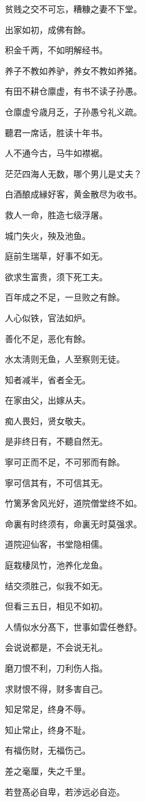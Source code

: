 \documentclass[12pt,oneside]{book}
\begin{document}
贫贱之交不可忘，糟糠之妻不下堂。

出家如初，成佛有餘。

积金千两，不如明解经书。

养子不教如养驴，养女不教如养猪。

有田不耕仓廪虚，有书不读子孙愚。

仓廪虚兮歳月乏，子孙愚兮礼义疏。

聽君一席话，胜读十年书。

人不通今古，马牛如襟裾。

茫茫四海人无数，哪个男儿是丈夫？

白酒酿成縁好客，黄金散尽为收书。

救人一命，胜造七级浮屠。

城门失火，殃及池鱼。

庭前生瑞草，好事不如无。

欲求生富贵，须下死工夫。

百年成之不足，一旦败之有餘。

人心似铁，官法如炉。

善化不足，恶化有餘。

水太淸则无鱼，人至察则无徒。

知者减半，省者全无。

在家由父，出嫁从夫。

痴人畏妇，贤女敬夫。

是非终日有，不聽自然无。

寧可正而不足，不可邪而有餘。

寧可信其有，不可信其无。

竹篱茅舍风光好，道院僧堂终不如。

命裏有时终须有，命裏无时莫强求。

道院迎仙客，书堂隐相儒。

庭栽棲凤竹，池养化龙鱼。

结交须胜己，似我不如无。

但看三五日，相见不如初。

人情似水分髙下，世事如雲任巻舒。

会说说都是，不会说无礼。

磨刀恨不利，刀利伤人指。

求财恨不得，财多害自己。

知足常足，终身不辱。

知止常止，终身不耻。

有福伤财，无福伤己。

差之毫厘，失之千里。

若登髙必自卑，若渉远必自迩。
\end{document}
